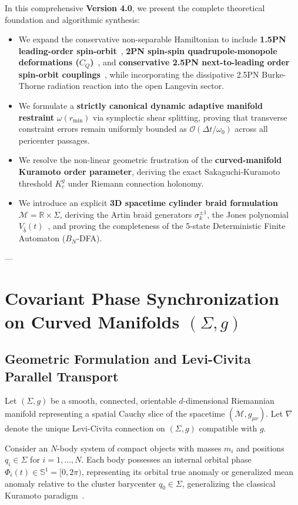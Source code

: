 \documentclass[11pt,a4paper,reqno]{article}
\theoremstyle{plain}
\theoremstyle{definition}
\theoremstyle{remark}
\numberwithin{equation}{section}
\begin{document}
In this comprehensive \textbf{Version 4.0}, we present the complete theoretical foundation and algorithmic synthesis:
\begin{itemize}
    \item We expand the conservative non-separable Hamiltonian to include \textbf{1.5PN leading-order spin-orbit}~\cite{BarkerOConnell1979}, \textbf{2PN spin-spin quadrupole-monopole deformations ($C_Q$)}~\cite{Kidder1995}, and \textbf{conservative 2.5PN next-to-leading order spin-orbit couplings}~\cite{FayeBlanchetBuonanno2006,DamourJaranowskiSchafer2008}, while incorporating the dissipative 2.5PN Burke-Thorne radiation reaction into the open Langevin sector.
    \item We formulate a \textbf{strictly canonical dynamic adaptive manifold restraint} $\omega(r_{\min})$ via symplectic shear splitting, proving that transverse constraint errors remain uniformly bounded as $\mathcal{O}(\Delta t / \omega_0)$ across all pericenter passages.
    \item We resolve the non-linear geometric frustration of the \textbf{curved-manifold Kuramoto order parameter}, deriving the exact Sakaguchi-Kuramoto threshold $K_c^g$ under Riemann connection holonomy.
    \item We introduce an explicit \textbf{3D spacetime cylinder braid formulation} $\mathcal{M} = \mathbb{R} \times \Sigma$, deriving the Artin braid generators $\sigma_k^{\pm 1}$, the Jones polynomial $V_{\hat{b}}(t)$~\cite{Jones1985}, and proving the completeness of the 5-state Deterministic Finite Automaton ($B_N$-DFA).
\end{itemize}

---

\section{Covariant Phase Synchronization on Curved Manifolds \texorpdfstring{$(\Sigma, g)$}{(Sigma, g)}}

\subsection{Geometric Formulation and Levi-Civita Parallel Transport}
Let $(\Sigma, g)$ be a smooth, connected, orientable $d$-dimensional Riemannian manifold representing a spatial Cauchy slice of the spacetime $(\mathcal{M}, g_{\mu\nu})$. Let $\nabla$ denote the unique Levi-Civita connection on $(\Sigma, g)$ compatible with $g$.

Consider an $N$-body system of compact objects with masses $m_i$ and positions $q_i \in \Sigma$ for $i = 1, \dots, N$. Each body possesses an internal orbital phase $\Phi_i(t) \in \mathbb{S}^1 = [0, 2\pi)$, representing its orbital true anomaly or generalized mean anomaly relative to the cluster barycenter $q_0 \in \Sigma$, generalizing the classical Kuramoto paradigm~\cite{Kuramoto1975}.
\end{document}
